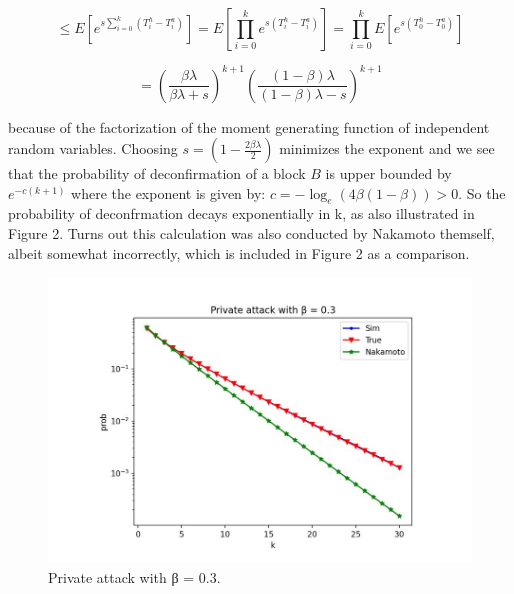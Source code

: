 \begin{equation}
	\leq E[e^{s\sum_{i=0}^{k}(T_{i}^{h} - T_{i}^{a})}] = E[\prod_{i=0}^{k}e^{s(T_{i}^{h} - T_{i}^{a})}] = \prod_{i=0}^{k}E[e^{s(T_{0}^{h} - T_{0}^{a})}]
\end{equation}

\begin{equation}
	= (\frac{\beta\lambda}{\beta \lambda + s})^{k + 1} (\frac{(1 - \beta) \lambda}{(1 - \beta) \lambda - s})^{k + 1}
\end{equation}

because of the factorization of the moment generating function of independent random variables. Choosing $s = (1−\frac{2\beta\lambda}{2})$ minimizes the exponent and we see that the probability of deconfirmation of a block $B$ is upper bounded by $e^{−c(k+1)}$ where the exponent is given by:
$c = − \log_{e}(4\beta(1 - \beta)) > 0.$
So the probability of deconfrmation decays exponentially in k, as also illustrated in Figure 2. Turns out this calculation was also conducted by Nakamoto themself, albeit somewhat incorrectly, which is included in Figure 2 as a comparison.
\begin{figure}[h!]
	\centering
	\includegraphics[width=0.6\linewidth]{Fig/06/F2}
	\caption{Private attack with β = 0.3.}
	\label{fig:f1}
\end{figure}
